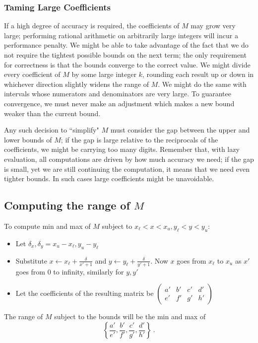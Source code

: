\documentclass[11pt, oneside]{amsart}   	%
\newcommand{\bihomographic}[8]{\left(\begin{smallmatrix}#1&#2&#3&#4\\#5&#6&#7&#8\end{smallmatrix}\right)}
\begin{document}
\subsubsection{Taming Large Coefficients}
If a high degree of accuracy is required, the coefficients of $M$ may grow very large; performing rational arithmetic on arbitrarily large integers will incur a performance penalty. We might be able to take advantage of the fact that we do not require the tightest possible bounds on the next term; the only requirement for correctness is that the bounds converge to the correct value. We might divide every coefficient of $M$ by some large integer $k$, rounding each result up or down in whichever direction slightly widens the range of $M$. We might do the same with intervals whose numerators and denominators are very large. To guarantee convergence, we must never make an adjustment which makes a new bound weaker than the current bound.

Any such decision to ``simplify" $M$ must consider the gap between the upper and lower bounds of $M$; if the gap is large relative to the reciprocals of the coefficients, we might be carrying too many digits. Remember that, with lazy evaluation, all computations are driven by how much accuracy we need; if the gap is small, yet we are still continuing the computation, it means that we need even tighter bounds. In such cases large coefficients might be unavoidable.


\subsection{Computing the range of $M$}\label{sec:ComputeBounds}
To compute min and max of $M$ subject to $x_{\ell} < x < x_u, y_{\ell} < y < y_u$:
\begin{itemize}
\item Let $\delta_x, \delta_y = x_u - x_{\ell}, y_u - y_{\ell}$
\item Substitute $x \leftarrow x_{\ell} + \frac{\delta}{x'+1}$ and $y \leftarrow y_{\ell} + \frac{\delta}{y'+1}$. Now $x$ goes from $x_{\ell}$ to $x_u$ as $x'$ goes from 0 to infinity, similarly for $y,y'$
\item Let the coefficients of the resulting matrix be $\bihomographic{a'}{b'}{c'}{d'}{e'}{f'}{g'}{h'}$
\end{itemize}
The range of $M$ subject to the bounds will be the min and max of 
\[
\left\{ \frac{a'}{e'},\frac{b'}{f'},\frac{c'}{g'},\frac{d'}{h'} \right\}\ .
\]
\end{document}
